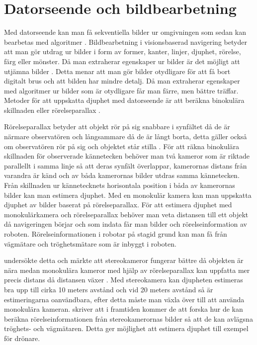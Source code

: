\section{Datorseende och bildbearbetning}

Med datorseende kan man få sekventiella bilder ur omgivningen som sedan kan bearbetas med algoritmer \citep{982903}. Bildbearbetning i visionsbaserad navigering betyder att man gör utdrag ur bilder i form av former, kanter, linjer, djuphet, rörelse, färg eller mönster. Då man extraherar egenskaper ur bilder är det möjligt att utjämna bilder \citep{mapbuildingsift}. Detta menar att man gör bilder otydligare för att få bort digitalt brus och att bilden har mindre detalj. Då man extraherar egenskaper med algoritmer ur bilder som är otydligare får man färre, men bättre träffar. Metoder för att uppskatta djuphet med datorseende är att beräkna binokulära skillnaden eller rörelseparallax \citep{suomimainittu}. 

Rörelseparallax betyder att objekt rör på sig snabbare i synfältet då de är närmare observatören och långsammare då de är långt borta, detta gäller också om observatören rör på sig och objektet står stilla \citep{suomimainittu, parallax}. För att räkna binokulära skillnaden för observerade kännetecken behöver man två kameror som är riktade parallellt i samma linje så att deras synfält överlappar, kamerornas distans från varandra är känd och av båda kamerornas bilder utdras samma kännetecken. Från skillnaden ur kännetecknets horisontala position i båda av kamerornas bilder kan man estimera djuphet. Med en monokulär kamera kan man uppskatta djuphet av bilder baserat på rörelseparallax. För att estimera djuphet med monokulärkamera och rörelseparallax behöver man veta distansen till ett objekt då navigeringen börjar och som indata får man bilder och rörelseinformation av roboten. Rörelseinformationen i robotar på stagid grund kan man få från vägmätare och tröghetsmätare som är inbyggt i roboten.

\cite{suomimainittu} undersökte detta och märkte att stereokameror fungerar bättre då objekten är nära medan monokulära kameror med hjälp av rörelseparallax kan uppfatta mer precis distans då distansen växer \citep{suomimainittu}. Med stereokamera kan djupheten estimeras bra upp till cirka 10 meters avstånd och vid 20 meters avstånd så är estimeringarna oanvändbara, efter detta måste man växla över till att använda monokulära kameran. \cite{suomimainittu} skriver att i framtiden kommer de att forska hur de kan beräkna rörelseinformationen från stereokamerornas bilder så att de kan avlägsna tröghets- och vägmätaren. Detta ger möjlighet att estimera djuphet till exempel för drönare.

